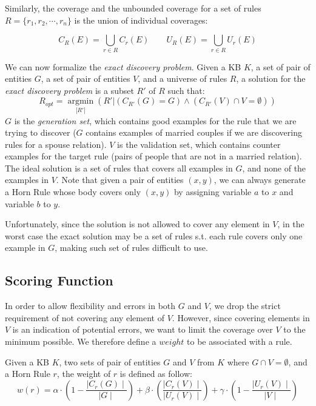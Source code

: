 
Similarly, the coverage and the unbounded coverage for a set of rules $R=\{r_1,r_2,\cdots,r_n\}$ is the union of individual coverages:

$$C_R(E) = \bigcup \limits_{r \in R} C_r(E) \qquad U_R(E) = \bigcup \limits_{r \in R} U_r(E) $$

We can now formalize the \emph{exact discovery problem}.
Given a KB $K$, a set of pair of entities $G$, a set of pair of entities $V$, and a universe of rules $R$, 
a solution for the \emph{exact discovery problem} is a subset $R'$ of $R$  such that:
$$R_{opt}=\underset{|R'|}{\operatorname{argmin}}(R'|(C_{R'}(G) = G) \wedge (C_{R'}(V) \cap V = \emptyset) )$$
$G$ is the \emph{generation set}, which contains good examples for the rule that we are trying to discover ($G$ contains examples of married couples if we are discovering rules for a spouse relation). $V$ is the validation set, which contains counter examples for the target rule (pairs of people that are not in a married relation). The ideal solution is a set of rules that covers all examples in $G$, and none of the examples in $V$. Note that given a pair of entities $(x,y)$, we can always generate a Horn Rule whose body covers only $(x,y)$ by assigning variable $a$ to $x$ and variable $b$ to $y$.

Unfortunately, since the solution is not allowed to cover any element in $V$, in the worst case the exact solution may be a set of rules s.t. each rule covers only one example in $G$, making such set of rules difficult to use.

\subsection{Scoring Function}
In order to allow flexibility and errors in both $G$ and $V$, we drop the strict requirement of not covering any element of $V$. However, since covering elements in $V$ is an indication of potential errors, we want to limit the coverage over $V$ to the minimum possible. We therefore define a $weight$ to be associated with a rule.


Given a KB $K$, two sets of pair of entities $G$ and $V$ from $K$ where $G \cap V = \emptyset$, and a Horn Rule $r$, the weight of $r$ is defined as follow:
\begin{equation*}
	w(r) = \alpha \cdot (1-\frac{\mid C_{r}(G)\mid}{\mid G \mid}) +\beta \cdot (\frac{\mid C_{r}(V) \mid}{\mid U_{r}(V)\mid})  +\gamma \cdot (1-\frac{\mid U_{r}(V)\mid}{\mid V \mid})
\end{equation*}

